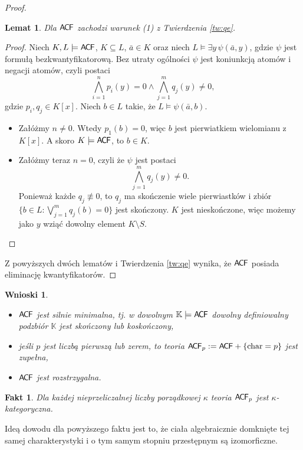 \documentclass{article}
\theoremstyle{plain}
\newtheorem{wnn}[thm]{Wnioski}
\newtheorem{lem}[thm]{Lemat}
\newtheorem{fakt}[thm]{Fakt}
\theoremstyle{definition}
\theoremstyle{remark}
\newcommand{\ACF}{\mathsf{A \mkern-2.0mu C \mkern-1.1mu F}}
\begin{document}
\begin{proof}
\begin{lem}
	Dla $\ACF$ zachodzi warunek (1) z Twierdzenia \ref{tw:qe}.
\end{lem}
\begin{proof}
	Niech $K, L \models \ACF$, $K \subseteq L$, $\bar{a} \in K$ oraz
	niech $L \models \exists y \, \psi(\bar{a}, y)$, gdzie $\psi$ jest formułą
	bezkwantyfikatorową. Bez utraty ogólności $\psi$ jest koniunkcją
	atomów i negacji atomów, czyli postaci
	\[
		\bigwedge_{i = 1}^n p_i(y) = 0 \wedge
		\bigwedge_{j = 1}^m q_j(y) \not= 0,
	\]
	gdzie $p_i, q_j \in K[x]$.
	Niech $b \in L$ takie, że $L \models \psi(\bar{a}, b)$.
	\begin{itemize}
		\item Załóżmy $n \not= 0$. Wtedy $p_1(b) = 0$, więc $b$ jest
			pierwiatkiem wielomianu z $K[x]$. %
			A skoro $K \models \ACF$, to $b \in K$.
		\item Załóżmy teraz $n = 0$, czyli że $\psi$ jest postaci
	\[
		\bigwedge_{j = 1}^m q_j(y) \not= 0.
	\]
	Ponieważ każde $q_j \not\equiv 0$, to $q_j$ ma skończenie wiele
			pierwiastków i zbiór
			$\{b \in L \colon \bigvee_{j = 1}^m q_j(b) = 0\}$
			jest skończony. $K$ jest nieskończone, więc możemy jako
			$y$ wziąć dowolny element $K \setminus S$.
	\end{itemize}
\end{proof}
Z powyższych dwóch lematów i Twierdzenia \ref{tw:qe} wynika, że $\ACF$ posiada
eliminację kwantyfikatorów.
\end{proof}

\begin{wnn}
	~\begin{itemize}
		\item $\ACF$ jest silnie minimalna, tj. w dowolnym $\mathbb{K} \models \ACF$ dowolny definiowalny podzbiór $\mathbb{K}$ jest skończony lub koskończony,
		\item jeśli $p$ jest liczbą pierwszą lub zerem, to teoria $\ACF_p := \ACF +  \{\text{char} = p\}$ jest zupełna,
		\item $\ACF$ jest rozstrzygalna.
	\end{itemize}
\end{wnn}

\begin{fakt}
	Dla każdej nieprzeliczalnej liczby porządkowej $\kappa$ teoria $\ACF_p$ jest $\kappa$-kategoryczna.
\end{fakt}
Ideą dowodu dla powyższego faktu jest to, że ciała algebraicznie domknięte tej samej charakterystyki i o tym samym stopniu przestępnym są izomorficzne.
\end{document}
